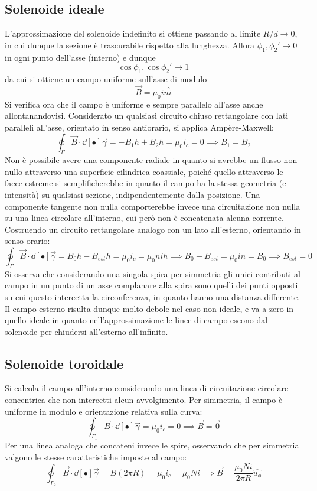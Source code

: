 \subsection{Solenoide ideale}
L'approssimazione del solenoide indefinito si ottiene passando al limite $R/d \rightarrow 0$, in cui dunque la sezione è trascurabile rispetto alla lunghezza. Allora $\phi_1, \phi_2' \rightarrow 0$ in ogni punto dell'asse (interno) e dunque
\[\cos \phi_1, \cos \phi_2' \rightarrow 1\]
da cui si ottiene un campo uniforme sull'asse di modulo
\[\vec{B} = \mu_0 i n \hat{i}\]
Si verifica ora che il campo è uniforme e sempre parallelo all'asse anche allontanandovisi. Considerato un qualsiasi circuito chiuso rettangolare con lati paralleli all'asse, orientato in senso antiorario, si applica Ampère-Maxwell:
\[\oint_\Gamma \vec{B} \cdot \dd[•]{\vec{\gamma}} = - B_1 h + B_2 h = \mu_0 i_c = 0 \implies B_1 = B_2\]
Non è possibile avere una componente radiale in quanto si avrebbe un flusso non nullo attraverso una superficie cilindrica coassiale, poiché quello attraverso le facce estreme si semplificherebbe in quanto il campo ha la stessa geometria (e intensità) su qualsiasi sezione, indipendentemente dalla posizione. Una componente tangente non nulla comporterebbe invece una circuitazione non nulla su una linea circolare all'interno, cui però non è concatenata alcuna corrente.
\\Costruendo un circuito rettangolare analogo con un lato all'esterno, orientando in senso orario:
\[\oint_\Gamma \vec{B} \cdot \dd[•]{\vec{\gamma}} = B_0 h - B_{est} h = \mu_0 i_c = \mu_0 n i h \implies B_0 - B_{est} = \mu_0 i n = B_0 \implies B_{est} = 0\]
Si osserva che considerando una singola spira per simmetria gli unici contributi al campo in un punto di un asse complanare alla spira sono quelli dei punti opposti su cui questo intercetta la circonferenza, in quanto hanno una distanza differente. Il campo esterno risulta dunque molto debole nel caso non ideale, e va a zero in quello ideale in quanto nell'approssimazione le linee di campo escono dal solenoide per chiudersi all'esterno all'infinito.

\subsection{Solenoide toroidale}
Si calcola il campo all'interno considerando una linea di circuitazione circolare concentrica che non intercetti alcun avvolgimento. Per simmetria, il campo è uniforme in modulo e orientazione relativa sulla curva:
\[\oint_{\Gamma_1} \vec{B} \cdot \dd[•]{\vec{\gamma}} = \mu_0 i_c = 0 \implies \vec{B} = \vec{0}\]
Per una linea analoga che concateni invece le spire, osservando che per simmetria valgono le stesse caratteristiche imposte al campo:
\[\oint_{\Gamma_2} \vec{B} \cdot \dd[•]{\vec{\gamma}} = B (2 \pi R) = \mu_0 i_c = \mu_0 N i \implies \vec{B} = \frac{\mu_0 N i}{2 \pi R} \hat{u_\phi}\]

